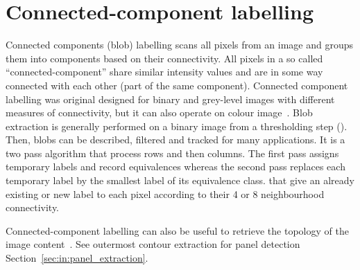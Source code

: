 \section{Connected-component labelling} %
\label{sec:ap:connected_component_labelling}
Connected components (blob) labelling scans all pixels from an image and groups them into components based on their connectivity.
All pixels in a so called ``connected-component'' share similar intensity values and are in some way connected with each other (part of the same component).
Connected component labelling was original designed for binary and grey-level images with different measures of connectivity, but it can also operate on colour image~\cite{dillencourt1992general}.
Blob extraction is generally performed on a binary image from a thresholding step ().
Then, blobs can be described, filtered and tracked for many applications.
It is a two pass algorithm that process rows and then columns.
The first pass assigns temporary labels and record equivalences whereas the second pass replaces each temporary label by the smallest label of its equivalence class. that give an already existing or new label to each pixel according to their 4 or 8 neighbourhood connectivity.

Connected-component labelling can also be useful to retrieve the topology of the image content~\cite{suzuki1985topological}.
See outermost contour extraction for panel detection Section~\ref{sec:in:panel_extraction}.






